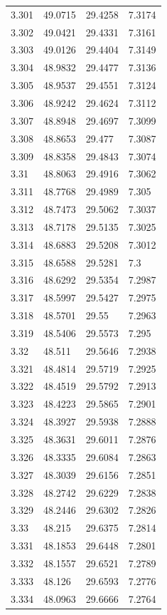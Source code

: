 \begin{tabular}{llll}
3.301 & 49.0715 & 29.4258 & 7.3174 \\
3.302 & 49.0421 & 29.4331 & 7.3161 \\
3.303 & 49.0126 & 29.4404 & 7.3149 \\
3.304 & 48.9832 & 29.4477 & 7.3136 \\
3.305 & 48.9537 & 29.4551 & 7.3124 \\
3.306 & 48.9242 & 29.4624 & 7.3112 \\
3.307 & 48.8948 & 29.4697 & 7.3099 \\
3.308 & 48.8653 & 29.477 & 7.3087 \\
3.309 & 48.8358 & 29.4843 & 7.3074 \\
3.31 & 48.8063 & 29.4916 & 7.3062 \\
3.311 & 48.7768 & 29.4989 & 7.305 \\
3.312 & 48.7473 & 29.5062 & 7.3037 \\
3.313 & 48.7178 & 29.5135 & 7.3025 \\
3.314 & 48.6883 & 29.5208 & 7.3012 \\
3.315 & 48.6588 & 29.5281 & 7.3 \\
3.316 & 48.6292 & 29.5354 & 7.2987 \\
3.317 & 48.5997 & 29.5427 & 7.2975 \\
3.318 & 48.5701 & 29.55 & 7.2963 \\
3.319 & 48.5406 & 29.5573 & 7.295 \\
3.32 & 48.511 & 29.5646 & 7.2938 \\
3.321 & 48.4814 & 29.5719 & 7.2925 \\
3.322 & 48.4519 & 29.5792 & 7.2913 \\
3.323 & 48.4223 & 29.5865 & 7.2901 \\
3.324 & 48.3927 & 29.5938 & 7.2888 \\
3.325 & 48.3631 & 29.6011 & 7.2876 \\
3.326 & 48.3335 & 29.6084 & 7.2863 \\
3.327 & 48.3039 & 29.6156 & 7.2851 \\
3.328 & 48.2742 & 29.6229 & 7.2838 \\
3.329 & 48.2446 & 29.6302 & 7.2826 \\
3.33 & 48.215 & 29.6375 & 7.2814 \\
3.331 & 48.1853 & 29.6448 & 7.2801 \\
3.332 & 48.1557 & 29.6521 & 7.2789 \\
3.333 & 48.126 & 29.6593 & 7.2776 \\
3.334 & 48.0963 & 29.6666 & 7.2764 \\

\end{tabular}
